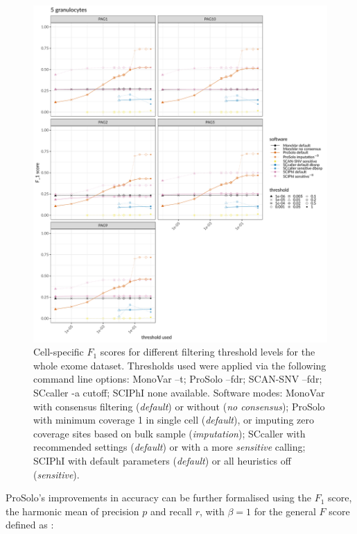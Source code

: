 \documentclass[authoryear,preprint,11pt]{scrartcl}
\begin{document}
\begin{figure}[!tpb]
  \includegraphics[width=\linewidth]{figs/Laehnemann2017/Laehnemann2017_prosolo-monovar-scansnv-sccaller-sciphi_F1_plot.pdf}
 \caption{
 Cell-specific $F_1$ scores for different filtering threshold levels for the whole exome dataset.\newline \footnotesize
  Thresholds used were applied via the following command line options:
  MonoVar {\ttfamily --t};
  ProSolo {\ttfamily --fdr};
  SCAN-SNV {\ttfamily --fdr};
  SCcaller {\ttfamily -a cutoff};
  SCIPhI {\ttfamily none available}.
  Software modes:
  MonoVar with consensus filtering ({\itshape default}) or without ({\itshape no consensus});
  ProSolo with minimum coverage 1 in single cell ({\itshape default}), or imputing zero coverage sites based on bulk sample ({\itshape imputation});
  SCcaller with recommended settings ({\itshape default}) or with a more {\itshape sensitive} calling;
  SCIPhI with default parameters ({\itshape default}) or all heuristics off ({\itshape sensitive}).
 }
 \label{fig:F_1-scores_Laehnemann2017}
\end{figure}

ProSolo's improvements in accuracy can be further formalised using the $F_1$ score, the harmonic mean of precision $p$ and recall $r$, with $\beta = 1$ for the general $F$ score defined as \citep{van_rijsbergen_evaluation_1979,chinchor_muc-4_1992}:\\
\end{document}
